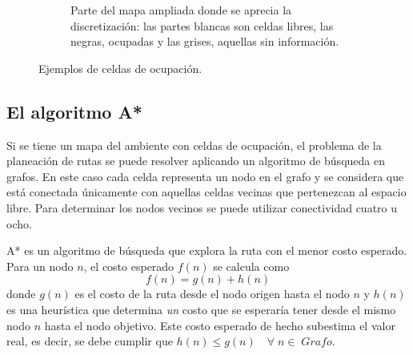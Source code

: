 \documentclass[a4paper]{article}
\begin{document}
\begin{figure}
\begin{subfigure}{0.4\textwidth}
    \caption{Parte del mapa ampliada donde se aprecia la discretización: las partes blancas son celdas libres, las negras, ocupadas y las grises, aquellas sin información.}
  \end{subfigure}
  \caption{Ejemplos de celdas de ocupación.}
  \label{fig:OccGrids}
\end{figure}

\subsection{El algoritmo A*}
\label{sec:AStar}
Si se tiene un mapa del ambiente con celdas de ocupación, el problema de la planeación de rutas se puede resolver aplicando un algoritmo de búsqueda en grafos. En este caso cada celda representa un nodo en el grafo y se considera que está conectada únicamente con aquellas celdas vecinas que pertenezcan al espacio libre. Para determinar los nodos vecinos se puede utilizar conectividad cuatro u ocho.

A* es un algoritmo de búsqueda que explora la ruta con el menor costo esperado. Para un nodo $n$, el costo esperado $f(n)$ se calcula como 
\[f(n) = g(n) + h(n)\]
donde $g(n)$ es el costo de la ruta desde el nodo origen hasta el nodo $n$ y $h(n)$ es una heurística que determina \textit{un} costo que se esperaría tener desde el mismo nodo $n$ hasta el nodo objetivo. Este costo esperado de hecho subestima el valor real, es decir, se debe cumplir que $h(n) \leq g(n)\quad \forall\; n \in\; Grafo$. 
\end{document}
